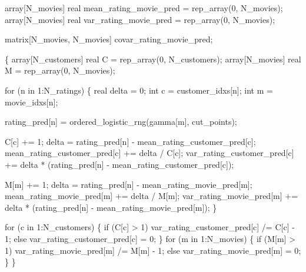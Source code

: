 \documentclass[
  letterpaper,
  DIV=11,
  numbers=noendperiod]{scrartcl}
\newenvironment{Shaded}{\begin{snugshade}}{\end{snugshade}}
\newcommand{\ControlFlowTok}[1]{\textcolor[rgb]{0.00,0.23,0.31}{#1}}
\newcommand{\DataTypeTok}[1]{\textcolor[rgb]{0.68,0.00,0.00}{#1}}
\newcommand{\DecValTok}[1]{\textcolor[rgb]{0.68,0.00,0.00}{#1}}
\newcommand{\NormalTok}[1]{\textcolor[rgb]{0.00,0.23,0.31}{#1}}
\begin{document}
\begin{codelisting}
\begin{Shaded}
\begin{Highlighting}[]
  \DataTypeTok{array}\NormalTok{[N\_movies] }\DataTypeTok{real}\NormalTok{ mean\_rating\_movie\_pred = rep\_array(}\DecValTok{0}\NormalTok{, N\_movies);}
  \DataTypeTok{array}\NormalTok{[N\_movies] }\DataTypeTok{real}\NormalTok{ var\_rating\_movie\_pred = rep\_array(}\DecValTok{0}\NormalTok{, N\_movies);}

  \DataTypeTok{matrix}\NormalTok{[N\_movies, N\_movies] covar\_rating\_movie\_pred;}

\NormalTok{  \{}
    \DataTypeTok{array}\NormalTok{[N\_customers] }\DataTypeTok{real}\NormalTok{ C = rep\_array(}\DecValTok{0}\NormalTok{, N\_customers);}
    \DataTypeTok{array}\NormalTok{[N\_movies] }\DataTypeTok{real}\NormalTok{ M = rep\_array(}\DecValTok{0}\NormalTok{, N\_movies);}

    \ControlFlowTok{for}\NormalTok{ (n }\ControlFlowTok{in} \DecValTok{1}\NormalTok{:N\_ratings) \{}
      \DataTypeTok{real}\NormalTok{ delta = }\DecValTok{0}\NormalTok{;}
      \DataTypeTok{int}\NormalTok{ c = customer\_idxs[n];}
      \DataTypeTok{int}\NormalTok{ m = movie\_idxs[n];}

\NormalTok{      rating\_pred[n] = ordered\_logistic\_rng(gamma[m], cut\_points);}

\NormalTok{      C[c] += }\DecValTok{1}\NormalTok{;}
\NormalTok{      delta = rating\_pred[n] {-} mean\_rating\_customer\_pred[c];}
\NormalTok{      mean\_rating\_customer\_pred[c] += delta / C[c];}
\NormalTok{      var\_rating\_customer\_pred[c]}
\NormalTok{        += delta * (rating\_pred[n] {-} mean\_rating\_customer\_pred[c]);}

\NormalTok{      M[m] += }\DecValTok{1}\NormalTok{;}
\NormalTok{      delta = rating\_pred[n] {-} mean\_rating\_movie\_pred[m];}
\NormalTok{      mean\_rating\_movie\_pred[m] += delta / M[m];}
\NormalTok{      var\_rating\_movie\_pred[m]}
\NormalTok{        += delta * (rating\_pred[n] {-} mean\_rating\_movie\_pred[m]);}
\NormalTok{    \}}

    \ControlFlowTok{for}\NormalTok{ (c }\ControlFlowTok{in} \DecValTok{1}\NormalTok{:N\_customers) \{}
      \ControlFlowTok{if}\NormalTok{ (C[c] \textgreater{} }\DecValTok{1}\NormalTok{)}
\NormalTok{        var\_rating\_customer\_pred[c] /= C[c] {-} }\DecValTok{1}\NormalTok{;}
      \ControlFlowTok{else}
\NormalTok{        var\_rating\_customer\_pred[c] = }\DecValTok{0}\NormalTok{;}
\NormalTok{    \}}
    \ControlFlowTok{for}\NormalTok{ (m }\ControlFlowTok{in} \DecValTok{1}\NormalTok{:N\_movies) \{}
      \ControlFlowTok{if}\NormalTok{ (M[m] \textgreater{} }\DecValTok{1}\NormalTok{)}
\NormalTok{        var\_rating\_movie\_pred[m] /= M[m] {-} }\DecValTok{1}\NormalTok{;}
      \ControlFlowTok{else}
\NormalTok{        var\_rating\_movie\_pred[m] = }\DecValTok{0}\NormalTok{;}
\NormalTok{    \}}
\NormalTok{  \}}


\end{Highlighting}
\end{Shaded}
\end{codelisting}
\end{document}

